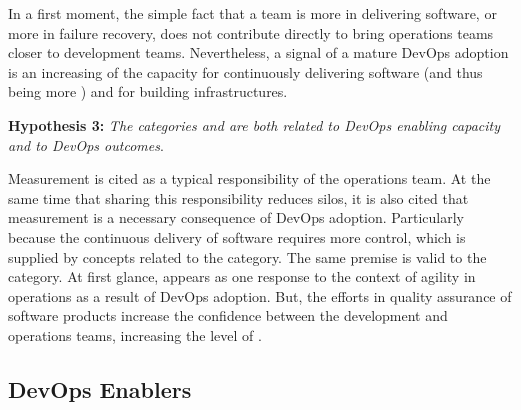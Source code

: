 In a first moment, the simple fact that a team is more
 in delivering software, or more  in failure recovery, does not
contribute directly to bring operations teams closer to development teams.
Nevertheless, a signal of a mature DevOps adoption is an increasing of the capacity for continuously
delivering software (and thus being more )
and for building  infrastructures.

\begin{mh}
\textbf{Hypothesis 3:} \textit{The categories  and 
are both related to DevOps enabling capacity and to DevOps outcomes}.
\end{mh}

Measurement is cited as a typical responsibility of the operations team.
At the same time that sharing this responsibility reduces silos,
it is also cited that measurement is a necessary consequence of DevOps adoption. Particularly because
the continuous delivery of software requires more control,
which is supplied by concepts related to the  category.
The same premise is valid to the  category. At first glance,
 appears as one response to the context of agility in operations
as a result of DevOps adoption. But, the efforts in quality assurance of software products
increase the confidence between the development and operations teams, increasing the level
of \cc.

\subsection{DevOps Enablers}


